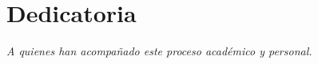 \chapter*{Dedicatoria}


\vspace*{4cm}

\begin{flushright}
\textit{A quienes han acompañado este proceso académico y personal.}
\end{flushright}
